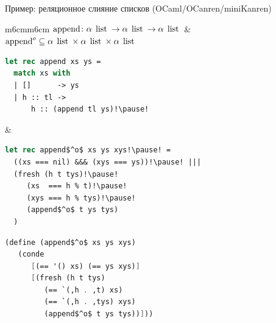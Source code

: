 \documentclass[10pt, mathserif]{beamer}
\let\\\tabularnewline
\let\\\tabularnewline
\newcommand{\oo}[1]{{#1}^o}
\newcommand{\inml}[1]{\mbox{\lstinline{#1}}}
\newcommand{\graybox}[1]{\colorbox{light-gray}{#1}}
\theoremstyle{definition}
\begin{document}
\begin{frame}[fragile]{Пример: реляционное слияние списков (OCaml/OCanren/miniKanren)}
\begin{adjustwidth}{-1.5em}{-1.5em}
\begin{tabular}{m{6cm}m{6cm}}
 \graybox{$\inml{append} \colon \alpha\:\inml{list} \to \alpha\:\inml{list} \to \alpha\:\inml{list}$} &
 \graybox{$\oo{\inml{append}}\subseteq\alpha\:\inml{list}\times\alpha\:\inml{list}\times\alpha\:\inml{list}$}\\
 \begin{lstlisting}[language=ocaml]
let rec append xs ys =
  match xs with
  | []      -> ys
  | h :: tl ->
      h :: (append tl ys)!\pause!
 \end{lstlisting} &
 \begin{lstlisting}[mathescape=true,language=ocaml]
let rec append$^o$ xs ys xys!\pause! =
  ((xs === nil) &&& (xys === ys))!\pause! |||
  (fresh (h t tys)!\pause!
     (xs  === h % t)!\pause!
     (xys === h % tys)!\pause!
     (append$^o$ t ys tys)
  )
 \end{lstlisting}
\end{tabular}\pause
\begin{center}
\begin{minipage}{6cm}
\begin{lstlisting}[mathescape=true,language=scheme]
(define (append$^o$ xs ys xys)
   (conde
      [(== '() xs) (== ys xys)]
      [(fresh (h t tys)
         (== `(,h . ,t) xs)
         (== `(,h . ,tys) xys)
         (append$^o$ t ys tys))]))
\end{lstlisting}
\end{minipage}
\end{center}

\end{adjustwidth}
\vskip5mm
\end{frame}
\end{document}
